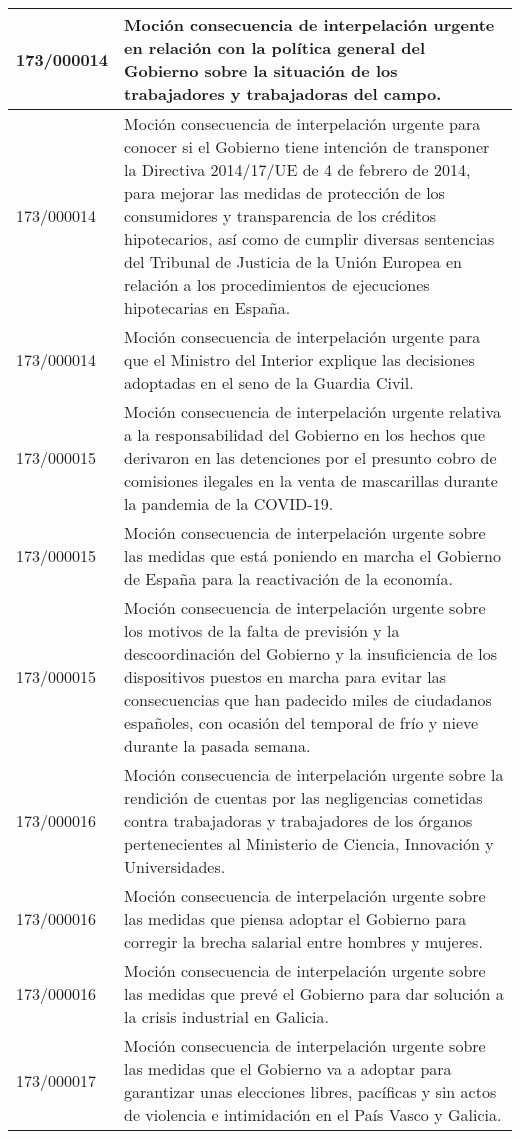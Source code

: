 {\begin{table}[H]
\begin{center}
\begin{tabularx}{\linewidth}{| l | X |}
\hline
173/000014 & Moción consecuencia de interpelación urgente en relación con la política general del Gobierno sobre la situación de los trabajadores y trabajadoras del campo. \\
\hline
173/000014 & Moción consecuencia de interpelación urgente para conocer si el Gobierno tiene intención de transponer la Directiva 2014/17/UE de 4 de febrero de 2014, para mejorar las medidas de protección de los consumidores y transparencia de los créditos hipotecarios, así como de cumplir diversas sentencias del Tribunal de Justicia de la Unión Europea en relación a los procedimientos de ejecuciones hipotecarias en España. \\
\hline
173/000014 & Moción consecuencia de interpelación urgente para que el Ministro del Interior explique las decisiones adoptadas en el seno de la Guardia Civil. \\
\hline
173/000015 & Moción consecuencia de interpelación urgente relativa a la responsabilidad del Gobierno en los hechos que derivaron en las detenciones por el presunto cobro de comisiones ilegales en la venta de mascarillas durante la pandemia de la COVID-19. \\
\hline
173/000015 & Moción consecuencia de interpelación urgente sobre las medidas que está poniendo en marcha el Gobierno de España para la reactivación de la economía. \\
\hline
173/000015 & Moción consecuencia de interpelación urgente sobre los motivos de la falta de previsión y la descoordinación del Gobierno y la insuficiencia de los dispositivos puestos en marcha para evitar las consecuencias que han padecido miles de ciudadanos españoles, con ocasión del temporal de frío y nieve durante la pasada semana. \\
\hline
173/000016 & Moción consecuencia de interpelación urgente sobre la rendición de cuentas por las negligencias cometidas contra trabajadoras y trabajadores de los órganos pertenecientes al Ministerio de Ciencia, Innovación y Universidades. \\
\hline
173/000016 & Moción consecuencia de interpelación urgente sobre las medidas que piensa adoptar el Gobierno para corregir la brecha salarial entre hombres y mujeres. \\
\hline
173/000016 & Moción consecuencia de interpelación urgente sobre las medidas que prevé el Gobierno para dar solución a la crisis industrial en Galicia. \\
\hline
173/000017 & Moción consecuencia de interpelación urgente sobre las medidas que el Gobierno va a adoptar para garantizar unas elecciones libres, pacíficas y sin actos de violencia e intimidación en el País Vasco y Galicia. \\

\end{tabularx}
\end{center}
\end{table}}
